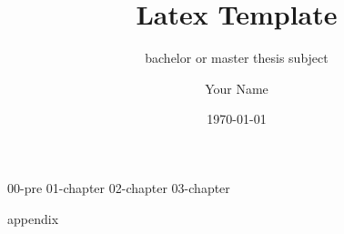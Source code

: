 \documentclass[
	final %
	,12pt %
	,a4paper %
	,BCOR=12mm %
	,headings=normal %
	,toc=graduated %
	,bibliography=totoc %
]{scrreprt} %
\author{Your Name}
\title{Latex Template}
\subtitle{bachelor or master thesis subject}
\date{\today}
\begin{document}
{00-pre}
{01-chapter}
{02-chapter}
{03-chapter}
\newpage

{appendix}
\end{document}
